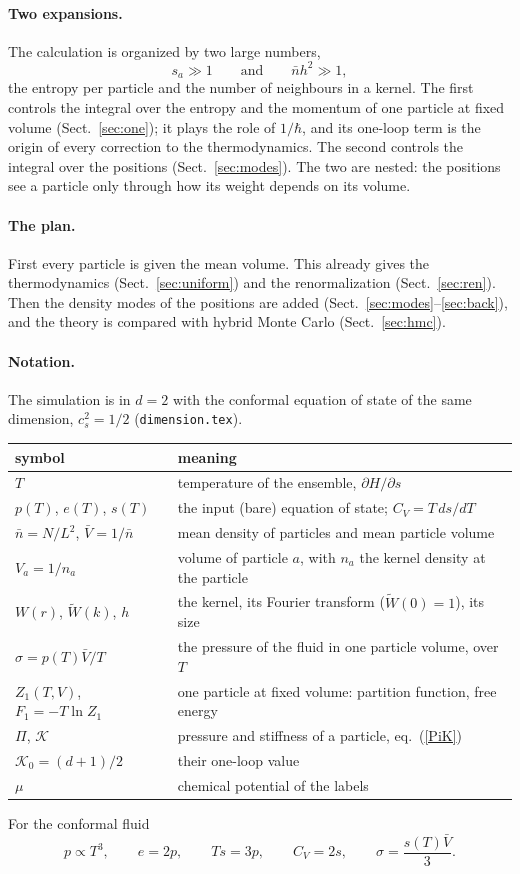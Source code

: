 \documentclass[11pt,aps,preprint,nofootinbib,superscriptaddress,tightenlines]{revtex4-2}
\def\st{\begin{equation}}
\def\stp{\end{equation}}
\def\Eq#1{eq.~(\ref{#1})}
\def\Sect#1{Sect.~\ref{#1}}
\let\oldparagraph\paragraph
\renewcommand{\paragraph}{\par\bigskip\oldparagraph}
\begin{document}
\paragraph{Two expansions.}  The calculation is organized by two large numbers,
\st
s_a\gg1\qquad\text{and}\qquad \bar nh^2\gg1 ,
\stp
the entropy per particle and the number of neighbours in a kernel.  The first controls the integral over the entropy and the momentum of one particle at
fixed volume (\Sect{sec:one}); it plays the role of $1/\hbar$, and its one-loop term is the origin of every correction to the thermodynamics.  The
second controls the integral over the positions (\Sect{sec:modes}).  The two are nested: the positions see a particle only through how its weight
depends on its volume.

\paragraph{The plan.}  First every particle is given the mean volume.  This already gives the thermodynamics (\Sect{sec:uniform}) and the
renormalization (\Sect{sec:ren}).  Then the density modes of the positions are added (\Sect{sec:modes}--\ref{sec:back}), and the theory is compared with
hybrid Monte Carlo (\Sect{sec:hmc}).

\paragraph{Notation.}  The simulation is in $d=2$ with the conformal equation of state of the same dimension, $c_s^2=1/2$ (\texttt{dimension.tex}).
\begin{center}
\begin{tabular}{ll}
\toprule
symbol & meaning \\
\midrule
$T$ & temperature of the ensemble, $\partial H/\partial s$ \\
$p(T)$, $e(T)$, $s(T)$ & the input (bare) equation of state; $C_V=T\,ds/dT$ \\
$\bar n=N/L^2$, $\bar V=1/\bar n$ & mean density of particles and mean particle volume \\
$V_a=1/n_a$ & volume of particle $a$, with $n_a$ the kernel density at the particle \\
$W(r)$, $\widetilde W(k)$, $h$ & the kernel, its Fourier transform ($\widetilde W(0)=1$), its size \\
$\sigma=p(T)\bar V/T$ & the pressure of the fluid in one particle volume, over $T$ \\
$Z_1(T,V)$, $F_1=-T\ln Z_1$ & one particle at fixed volume: partition function, free energy \\
$\Pi$, $\mathcal K$ & pressure and stiffness of a particle, \Eq{PiK} \\
$\mathcal K_0=(d+1)/2$ & their one-loop value \\
$\mu$ & chemical potential of the labels \\
\bottomrule
\end{tabular}
\end{center}
For the conformal fluid
\st
p\propto T^3,\qquad e=2p,\qquad Ts=3p,\qquad C_V=2s,\qquad \sigma=\frac{s(T)\bar V}3 .
\stp
\end{document}
